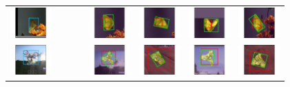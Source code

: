 \setlength{\tabcolsep}{0.25ex}

\begin{tabular}
{ccc ccccc}
\includegraphics[trim={2cm 0cm 2cm 0cm},clip,width = 0.61in]{img/snapshots/init/00011}
&&&
&\includegraphics[trim={2cm 0cm 2cm 0cm},clip,width = 0.61in]{img/snapshots/eco_uspblackedge/03073}
& \includegraphics[trim={2cm 0cm 2cm 0cm},clip,width = 0.61in]{img/snapshots/eco_uspblackedge/03108}
& \includegraphics[trim={2cm 0cm 2cm 0cm},clip,width = 0.61in]{img/snapshots/eco_uspblackedge/03143}
& \includegraphics[trim={2cm 0cm 2cm 0cm},clip,width = 0.61in]{img/snapshots/eco_uspblackedge/03214}
\\

\includegraphics[trim={2cm 0cm 2cm 0cm},clip,width = 0.61in]{img/snapshots/init/00038}
&&&

&\includegraphics[trim={2cm 0cm 2cm 0cm},clip,width = 0.61in]{img/snapshots/eco_uspblackedge/14691}
& \includegraphics[trim={2cm 0cm 2cm 0cm},clip,width = 0.61in]{img/snapshots/eco_uspblackedge/14724}
& \includegraphics[trim={2cm 0cm 2cm 0cm},clip,width = 0.61in]{img/snapshots/eco_uspblackedge/14775}
& \includegraphics[trim={2cm 0cm 2cm 0cm}, clip,width = 0.61in]{img/snapshots/eco_uspblackedge/14842}


\end{tabular}

